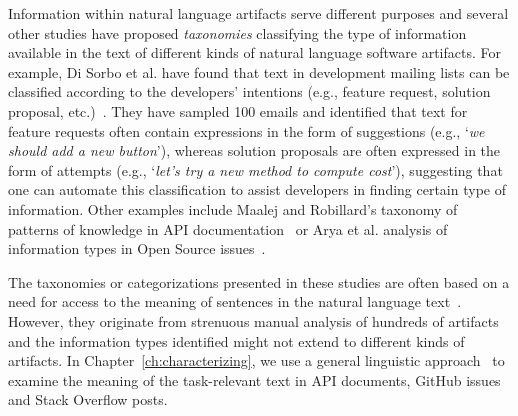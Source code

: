 Information within natural language artifacts 
serve different purposes and several other studies have
 proposed \textit{taxonomies} classifying the type of information
 available in the text of
 different kinds of natural language software artifacts.
For example, Di Sorbo et al. have found that 
text in development mailing lists can be classified according to the developers' intentions (e.g., feature request, solution proposal, etc.)~\cite{Sorbo2015}.
They have sampled 100 emails and identified that text for feature requests 
often contain expressions in the form of suggestions
(e.g., `\textit{we should add a new button}'), whereas solution proposals 
are often expressed in the form of attempts (e.g., `\textit{let's try a new method to compute cost}'),
suggesting that one can automate this classification to assist developers in finding 
certain type of information.
Other examples include Maalej and Robillard's taxonomy of patterns of knowledge in API documentation~\cite{Maalej2013}
or Arya et al. analysis of information types in Open Source issues~\cite{Arya2019}.



The taxonomies or categorizations presented in these studies are often based
on a need for access to the meaning of
sentences in the natural language text~\cite{berners2001, calero2006, witte2007}.
However, they originate from strenuous manual analysis 
of hundreds of artifacts and the information types identified 
might not extend to different kinds of artifacts.
In Chapter~\ref{ch:characterizing}, 
we use a general linguistic approach~\cite{fillmore1976frame} to
examine the meaning of the task-relevant text in 
API documents, GitHub issues and Stack Overflow posts.

